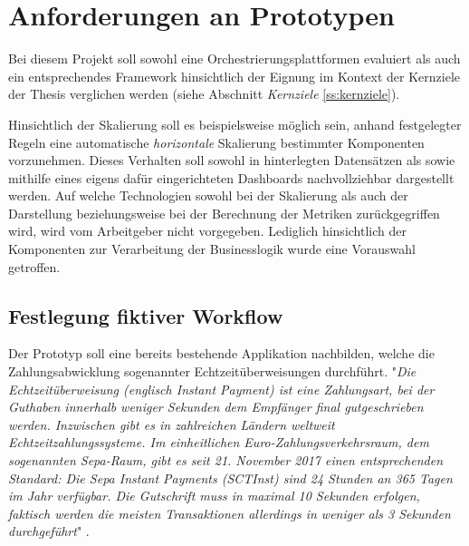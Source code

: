 \section{Anforderungen an Prototypen \checkmark}
\label{sec:anforderungProto}

Bei diesem Projekt soll sowohl eine Orchestrierungsplattformen evaluiert als auch ein entsprechendes Framework hinsichtlich der Eignung im Kontext der Kernziele der Thesis verglichen werden (siehe Abschnitt \emph{Kernziele} \ref{ss:kernziele}). 

Hinsichtlich der Skalierung soll es beispielsweise möglich sein, anhand festgelegter Regeln eine automatische \emph{horizontale} Skalierung bestimmter Komponenten vorzunehmen. Dieses Verhalten soll sowohl in hinterlegten Datensätzen als sowie mithilfe eines eigens dafür eingerichteten Dashboards nachvollziehbar dargestellt werden. Auf welche Technologien sowohl bei der Skalierung als auch der Darstellung beziehungsweise bei der Berechnung der Metriken zurückgegriffen wird, wird vom Arbeitgeber nicht vorgegeben. Lediglich hinsichtlich der Komponenten zur Verarbeitung der Businesslogik wurde eine Vorauswahl getroffen. 



\subsection{Festlegung fiktiver Workflow \checkmark}
\label{ss:fiktiverWorkflow}

Der Prototyp soll eine bereits bestehende Applikation nachbilden, welche die Zahlungsabwicklung sogenannter Echtzeitüberweisungen durchführt. "\emph{Die Echtzeitüberweisung (englisch Instant Payment) ist eine Zahlungsart, bei der Guthaben innerhalb weniger Sekunden dem Empfänger final gutgeschrieben werden. Inzwischen gibt es in zahlreichen Ländern weltweit Echtzeitzahlungssysteme. Im einheitlichen Euro-Zahlungsverkehrsraum, dem sogenannten Sepa-Raum, gibt es seit 21. November 2017 einen entsprechenden Standard: Die Sepa Instant Payments (SCTInst) sind 24 Stunden an 365 Tagen im Jahr verfügbar. Die Gutschrift muss in maximal 10 Sekunden erfolgen, faktisch werden die meisten Transaktionen allerdings in weniger als 3 Sekunden durchgeführt}" \cite{instpay-def}.


